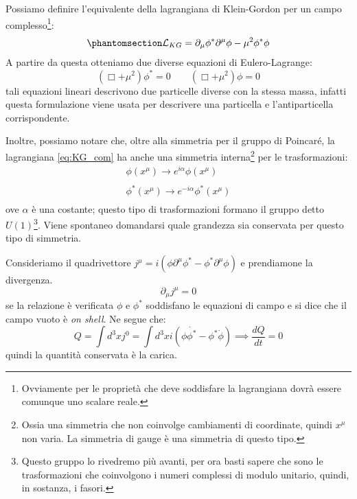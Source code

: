 Possiamo definire l'equivalente della lagrangiana di Klein-Gordon per un campo complesso\footnote{Ovviamente per le proprietà che deve soddisfare la lagrangiana dovrà essere comunque uno scalare reale.}:
\begin{equation}\phantomsection\label{eq:KG_com}
  \mathcal{L}_{KG}=\partial_\mu\phi^*\partial^\mu\phi-\mu^2\phi^*\phi
\end{equation}
A partire da questa otteniamo due diverse equazioni di Eulero-Lagrange:
\begin{equation}
  (\Box+\mu^2)\phi^*=0 \qquad (\Box+\mu^2)\phi=0 
\end{equation}
tali equazioni lineari descrivono due particelle diverse con la stessa massa, infatti questa formulazione viene usata per descrivere una particella e l'antiparticella corrispondente.

Inoltre, possiamo notare che, oltre alla simmetria per il gruppo di Poincaré, la lagrangiana \eqref{eq:KG_com} ha anche una simmetria interna\footnote{Ossia una simmetria che non coinvolge cambiamenti di coordinate, quindi $x^\mu$ non varia. La simmetria di gauge è una simmetria di questo tipo.} per le trasformazioni:
\begin{equation}
\begin{gathered}
    \phi(x^\mu)\xrightarrow[\text{}]{\text{}}e^{i\alpha}\phi(x^\mu)\\
    \phi^*(x^\mu)\xrightarrow[\text{}]{\text{}}e^{-i\alpha}\phi^*(x^\mu)
\end{gathered}
\end{equation}
ove $\alpha$ è una costante; questo tipo di trasformazioni formano il gruppo detto $U(1)$\footnote{Questo gruppo lo rivedremo più avanti, per ora basti sapere che sono le trasformazioni che coinvolgono i numeri complessi di modulo unitario, quindi, in sostanza, i fasori.}.
Viene spontaneo domandarsi quale grandezza sia conservata per questo tipo di simmetria.

Consideriamo il quadrivettore $j^\mu=i(\phi\partial^\mu\phi^*-\phi^*\partial^\mu\phi)$ e prendiamone la divergenza.
\begin{equation}
\partial_\mu j^\mu=0
\end{equation}
se la relazione è verificata $\phi$ e $\phi^*$ soddisfano le equazioni di campo e si dice che il campo vuoto è \textit{on shell}. Ne segue che:
\begin{equation}
Q=\int d^3x j^0 =\int d^3x i(\phi\dot{\phi^*}-\phi^*\dot{\phi}) \implies \dfrac{dQ}{dt}=0
\end{equation}
quindi la quantità conservata è la carica.

